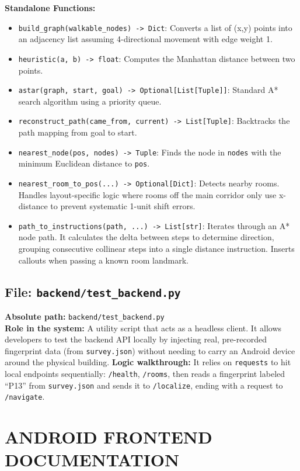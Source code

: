 \documentclass[11pt,a4paper]{article}
\begin{document}
\textbf{Standalone Functions:}
\begin{itemize}
\item \texttt{build\_graph(walkable\_nodes) -> Dict}: Converts a list of (x,y) points into an adjacency list assuming 4-directional movement with edge weight 1.
\item \texttt{heuristic(a, b) -> float}: Computes the Manhattan distance between two points.
\item \texttt{astar(graph, start, goal) -> Optional[List[Tuple]]}: Standard A* search algorithm using a priority queue.
\item \texttt{reconstruct\_path(came\_from, current) -> List[Tuple]}: Backtracks the path mapping from goal to start.
\item \texttt{nearest\_node(pos, nodes) -> Tuple}: Finds the node in \texttt{nodes} with the minimum Euclidean distance to \texttt{pos}.
\item \texttt{nearest\_room\_to\_pos(...) -> Optional[Dict]}: Detects nearby rooms. Handles layout-specific logic where rooms off the main corridor only use x-distance to prevent systematic 1-unit shift errors.
\item \texttt{path\_to\_instructions(path, ...) -> List[str]}: Iterates through an A* node path. It calculates the delta between steps to determine direction, grouping consecutive collinear steps into a single distance instruction. Inserts callouts when passing a known room landmark.
\end{itemize}
\subsection{File: \texttt{backend/test\_backend.py}}
\textbf{Absolute path:} \texttt{backend/test\_backend.py}\\
\textbf{Role in the system:} A utility script that acts as a headless client. It allows developers to test the backend API locally by injecting real, pre-recorded fingerprint data (from \texttt{survey.json}) without needing to carry an Android device around the physical building.
\textbf{Logic walkthrough:} It relies on \texttt{requests} to hit local endpoints sequentially: \texttt{/health}, \texttt{/rooms}, then reads a fingerprint labeled ``P13'' from \texttt{survey.json} and sends it to \texttt{/localize}, ending with a request to \texttt{/navigate}.
\section{ANDROID FRONTEND DOCUMENTATION}
\end{document}
